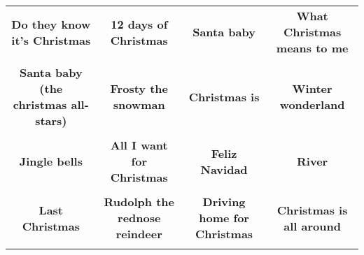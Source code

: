 \documentclass[12pt]{article} \usepackage{eso-pic, graphicx}
\newcommand{\background}[1]{%
\AddToShipoutPictureBG*{\texttt{[image: \#1]}}
}
\begin{document}
\tabcolsep=30.2pt \renewcommand{\arraystretch}{4.5}   \vspace*{4.3cm} \begin{center}  \begin{tabular}{c c c c}
\parbox{3cm}{\centering \textbf{Do they know it's Christmas}}& 
\parbox{3cm}{\centering \textbf{12 days of Christmas}}& 
\parbox{3cm}{\centering \textbf{Santa baby}}& 
\parbox{3cm}{\centering \textbf{What Christmas means to me}}\\ \\ 
\parbox{3cm}{\centering \textbf{Santa baby (the christmas all-stars)}}& 
\parbox{3cm}{\centering \textbf{Frosty the snowman}}& 
\parbox{3cm}{\centering \textbf{Christmas is}}& 
\parbox{3cm}{\centering \textbf{Winter wonderland}}\\ \\ 
\parbox{3cm}{\centering \textbf{Jingle bells}}& 
\parbox{3cm}{\centering \textbf{All I want for Christmas}}& 
\parbox{3cm}{\centering \textbf{Feliz Navidad}}& 
\parbox{3cm}{\centering \textbf{River}}\\ \\ 
\parbox{3cm}{\centering \textbf{Last Christmas}}& 
\parbox{3cm}{\centering \textbf{Rudolph the rednose reindeer}}& 
\parbox{3cm}{\centering \textbf{Driving home for Christmas}}& 
\parbox{3cm}{\centering \textbf{Christmas is all around}}\\ \\ 
\end{tabular} \background{discobingo.pdf} \end{center} 
\end{document}
